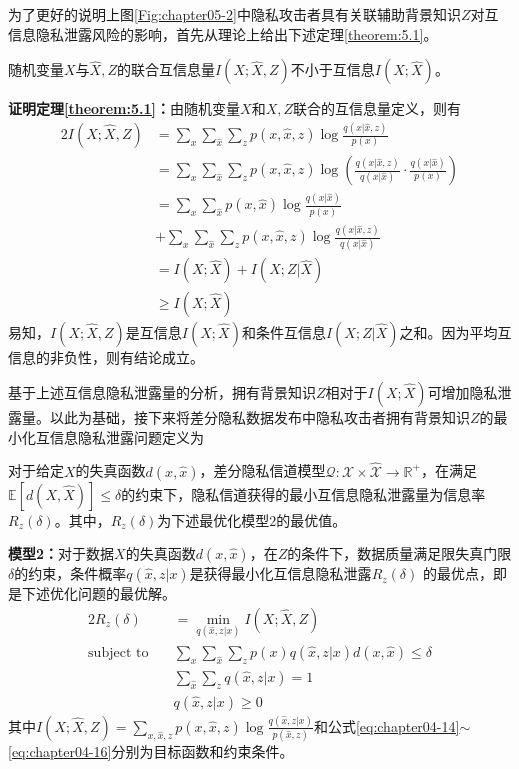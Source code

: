 为了更好的说明上图\ref{Fig:chapter05-2}中隐私攻击者具有关联辅助背景知识$Z$对互信息隐私泄露风险的影响，首先从理论上给出下述定理\ref{theorem:5.1}。
\begin{theorem} \label{theorem:5.1}随机变量$X$与$\hat{X},Z$的联合互信息量$I(X;\hat{X},Z)$不小于互信息$I(X;\hat{X})$。
\end{theorem}
\textbf{证明定理\ref{theorem:5.1}：}由随机变量$X$和$X,Z$联合的互信息量定义，则有
\begin{alignat}{2}
	I(X;\hat{X},Z) & =\sum_{x}\sum_{\hat{x}}\sum_{z}p(x,\hat{x},z)\log \frac{q(x|\hat{x},z)}{p(x)} \\
	 & = \sum_{x}\sum_{\hat{x}}\sum_{z}p(x,\hat{x},z)\log \left( \frac {q(x|\hat{x},z)}{q(x|\hat{x})}\cdot \frac{q(x|\hat{x})}{p(x)} \right)\\
	 & = \sum_{x}\sum_{\hat{x}}p(x,\hat{x})\log \frac{q(x|\hat{x})}{p(x)} \nonumber \\
	 & +\sum_{x}\sum_{\hat{x}}\sum_{z}p(x,\hat{x},z)\log \frac{q(x|\hat{x},z)}{q(x|\hat{x})}\\
	 & = I(X;\hat{X})+I(X;Z|\hat{X})\\
	 & \geq I(X;\hat{X})
\end{alignat}
易知，$I(X;\hat{X},Z)$是互信息$I(X;\hat{X})$和条件互信息$I(X;Z|\hat{X})$之和。因为平均互信息的非负性，则有结论成立。

基于上述互信息隐私泄露量的分析，拥有背景知识$Z$相对于$I(X;\hat{X})$可增加隐私泄露量。以此为基础，接下来将差分隐私数据发布中隐私攻击者拥有背景知识$Z$的最小化互信息隐私泄露问题定义为

\begin{definition}对于给定$X$的失真函数$d(x,\hat{x})$，差分隐私信道模型$\mathcal{Q}:\mathcal{X}\times \mathcal{\hat{X}}\rightarrow \mathbb{R}^{+}$，在满足$\mathbb{E}[d(X,\hat{X})]\leq \delta$的约束下，隐私信道获得的最小互信息隐私泄露量为信息率$R_{z}(\delta)$。其中，$R_{z}(\delta)$为下述最优化模型$2$的最优值。
\end{definition}

\textbf{模型2：}对于数据$X$的失真函数$d(x,\hat{x})$，在$Z$的条件下，数据质量满足限失真门限$\delta$的约束，条件概率$q(\hat{x},z|x)$是获得最小化互信息隐私泄露$R_{z}(\delta)$ 的最优点，即是下述优化问题的最优解。
\begin{alignat}{2}%
	R_{z}(\delta) & =\min_{q(\hat{x},z|x)}I(X;\hat{X},Z) \nonumber \\
	\mbox{subject to} \quad
	& \sum_{x}\sum_{\hat{x}}\sum_{z}p(x)q(\hat{x},z|x)d(x,\hat{x})\leq  \delta \label{eq:chapter04-14}\\
	& \sum_{\hat{x}}\sum_{z}q(\hat{x},z|x)=1\\
	& q(\hat{x},z|x) \geq 0\label{eq:chapter04-16}
\end{alignat}
其中$I(X;\hat{X},Z)=\sum_{x,\hat{x},z}p(x,\hat{x},z)\log \frac{q(\hat{x},z|x)}{p(\hat{x},z)}$和公式\ref{eq:chapter04-14}$\sim$\ref{eq:chapter04-16}分别为目标函数和约束条件。

